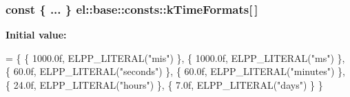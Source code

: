 \subsubsection[{\texorpdfstring{k\+Time\+Formats}{kTimeFormats}}]{\setlength{\rightskip}{0pt plus 5cm}const \{ ... \}   el\+::base\+::consts\+::k\+Time\+Formats\mbox{[}$\,$\mbox{]}}\hypertarget{namespaceel_1_1base_1_1consts_a884a02e0e8a8b7d37caef56e4ce3786e}{}\label{namespaceel_1_1base_1_1consts_a884a02e0e8a8b7d37caef56e4ce3786e}
{\bfseries Initial value\+:}
\begin{DoxyCode}
= \{
                            \{ 1000.0f, ELPP\_LITERAL(\textcolor{stringliteral}{"mis"}) \},
                            \{ 1000.0f, ELPP\_LITERAL(\textcolor{stringliteral}{"ms"}) \},
                            \{ 60.0f, ELPP\_LITERAL(\textcolor{stringliteral}{"seconds"}) \},
                            \{ 60.0f, ELPP\_LITERAL(\textcolor{stringliteral}{"minutes"}) \},
                            \{ 24.0f, ELPP\_LITERAL(\textcolor{stringliteral}{"hours"}) \},
                            \{ 7.0f, ELPP\_LITERAL(\textcolor{stringliteral}{"days"}) \}
                        \}
\end{DoxyCode}
